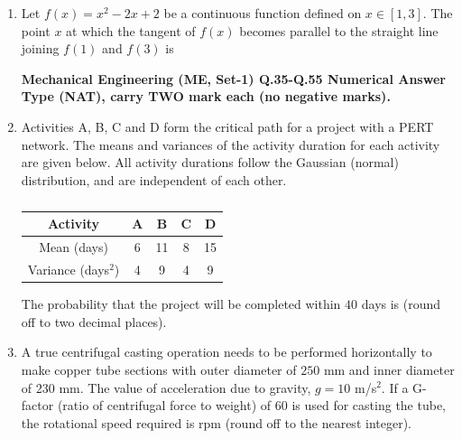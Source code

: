 \documentclass[journal]{IEEEtran}
\begin{document}
\begin{enumerate}
\hfill{}

\item Let $f(x) = x^2 - 2x + 2$ be a continuous function defined on $x \in [1,3]$.
The point $x$ at which the tangent of $f(x)$ becomes parallel to the straight line joining $f(1)$ and $f(3)$ is

\begin{enumerate}
\end{enumerate}

\hfill{}
\textbf{Mechanical Engineering (ME, Set-1)
Q.35-Q.55 Numerical Answer Type (NAT), carry TWO mark each (no negative marks).}
\item Activities A, B, C and D form the critical path for a project with a PERT
network. The means and variances of the activity duration for each activity
are given below. All activity durations follow the Gaussian (normal)
distribution, and are independent of each other.

\begin{table}[h!]
\caption*{}
\label{tab:pert_project}
\begin{tabular}{|c|c|c|c|c|}
\hline
Activity & A & B & C & D \\
\hline
Mean (days) & 6 & 11 & 8 & 15 \\
\hline
Variance (days$^2$) & 4 & 9 & 4 & 9 \\
\hline
\end{tabular}
\end{table}

The probability that the project will be completed within $40$ days is \underline{\hspace{2cm}} (round off to two decimal places).

\hfill{}

\item A true centrifugal casting operation needs to be performed horizontally to
make copper tube sections with outer diameter of $250$ mm and inner
diameter of $230$ mm. The value of acceleration due to gravity, $g=10$ m/s$^2$.
If a G-factor (ratio of centrifugal force to weight) of $60$ is used for casting
the tube, the rotational speed required is \underline{\hspace{2cm}} rpm (round off to the nearest integer).


\end{enumerate}
\end{document}
